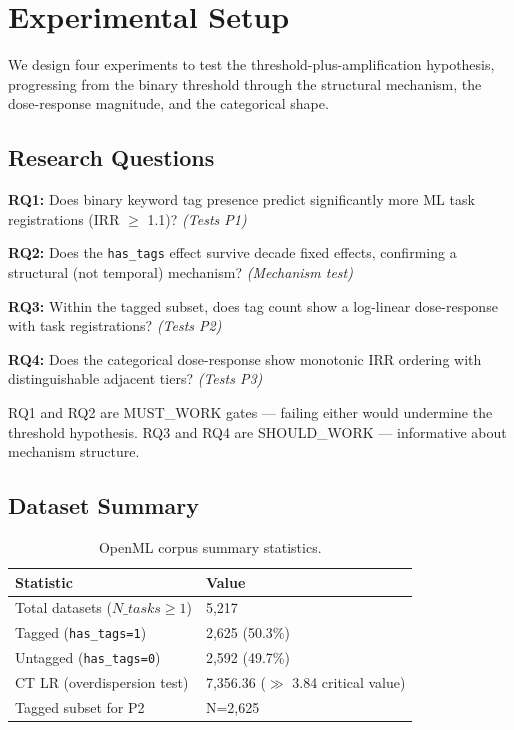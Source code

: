 \section{Experimental Setup}
\label{sec:experimental}

We design four experiments to test the threshold-plus-amplification hypothesis, progressing from the binary threshold through the structural mechanism, the dose-response magnitude, and the categorical shape.

\subsection{Research Questions}

\textbf{RQ1:} Does binary keyword tag presence predict significantly more ML task registrations (IRR $\geq$ 1.1)? \textit{(Tests P1)}

\textbf{RQ2:} Does the \texttt{has\_tags} effect survive decade fixed effects, confirming a structural (not temporal) mechanism? \textit{(Mechanism test)}

\textbf{RQ3:} Within the tagged subset, does tag count show a log-linear dose-response with task registrations? \textit{(Tests P2)}

\textbf{RQ4:} Does the categorical dose-response show monotonic IRR ordering with distinguishable adjacent tiers? \textit{(Tests P3)}

RQ1 and RQ2 are MUST\_WORK gates --- failing either would undermine the threshold hypothesis. RQ3 and RQ4 are SHOULD\_WORK --- informative about mechanism structure.

\subsection{Dataset Summary}

\begin{table}[h]
\centering
\caption{OpenML corpus summary statistics.}
\label{tab:dataset_summary}
\begin{tabular}{ll}
\toprule
Statistic & Value \\
\midrule
Total datasets ($N\_tasks \geq 1$) & 5,217 \\
Tagged (\texttt{has\_tags=1}) & 2,625 (50.3\%) \\
Untagged (\texttt{has\_tags=0}) & 2,592 (49.7\%) \\
CT LR (overdispersion test) & 7,356.36 ($\gg$ 3.84 critical value) \\
Tagged subset for P2 & N=2,625 \\
\bottomrule
\end{tabular}
\end{table}

